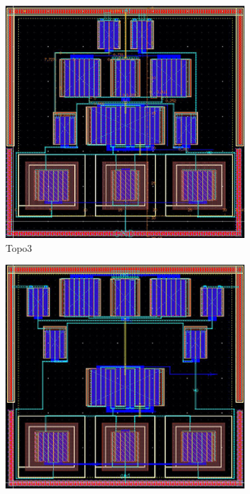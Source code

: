 \begin{figure}[ht]
\begin{subfigure}[t]{0.2\textwidth}
        \includegraphics[width=\textwidth]{Fig/MultTopo_Topo3.eps}
        \caption{Topo3}\label{fig:Topo3}
        \end{subfigure}
        \begin{subfigure}[t]{0.2\textwidth}
        \includegraphics[width=\textwidth]{Fig/MultTopo_Topo4.eps}

\end{subfigure}
\end{figure}
